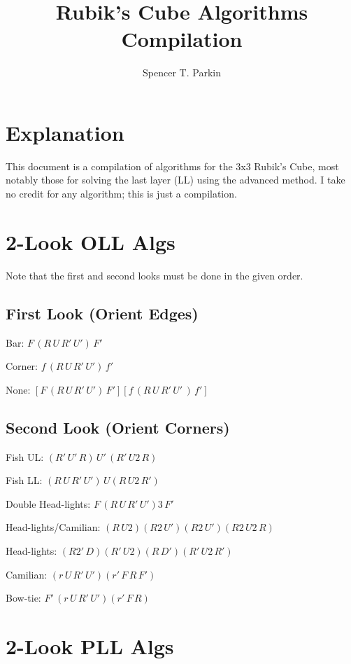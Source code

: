 \documentclass[12pt]{article}
\title{Rubik's Cube Algorithms Compilation}
\author{Spencer T. Parkin}
\begin{document}
\maketitle

\section*{Explanation}

This document is a compilation of algorithms for the 3x3 Rubik's Cube, most notably those
for solving the last layer (LL) using the advanced method.  I take no credit for any algorithm; this
is just a compilation.

\section*{2-Look OLL Algs}

Note that the first and second looks must be done in the given order.

\subsection*{First Look (Orient Edges)}

Bar: $F\,(R\,U\,R'\,U')\,F'$

\noindent
Corner: $f\,(R\,U\,R'\,U')\,f'$

\noindent
None: $[F\,(R\,U\,R'\,U')\,F'][f\,(R\,U\,R'\,U'\,)\,f']$

\subsection*{Second Look (Orient Corners)}

Fish UL: $(R'\,U'\,R)\,U'\,(R'\,U2\,R)$

\noindent
Fish LL: $(R\,U\,R'\,U')\,U(R\,U2\,R')$

\noindent
Double Head-lights: $F\,(R\,U\,R'\,U')3\,F'$

\noindent
Head-lights/Camilian: $(R\,U2)(R2\,U')(R2\,U')(R2\,U2\,R)$

\noindent
Head-lights: $(R2'\,D)(R'\,U2)(R\,D')(R'\,U2\,R')$

\noindent
Camilian: $(r\,U\,R'\,U')(r'\,F\,R\,F')$

\noindent
Bow-tie: $F'\,(r\,U\,R'\,U')(r'\,F\,R)$

\section*{2-Look PLL Algs}
\end{document}
